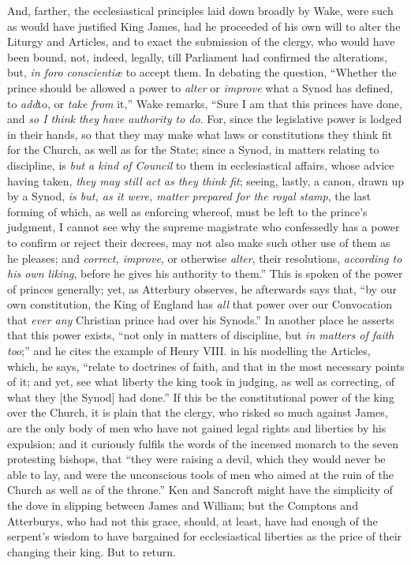 And, farther, the
ecclesiastical principles laid down broadly by Wake, were such as
would have justified King James, had he proceeded of his own will to
alter the Liturgy and Articles, and to exact the submission of the
clergy, who would have been bound, not, indeed, legally, till
Parliament had confirmed the alterations, but, \emph{in foro conscientiæ}
to accept them. In debating the question, ``Whether the prince should
be allowed a power to \emph{alter} or \emph{improve} what a Synod has
defined, to \emph{add}to, or \emph{take from} it,'' Wake remarks, ``Sure
I am that this princes have done, and \emph{so I think they have
authority to do}. For, since the legislative power is lodged in
their hands, so that they may make what laws or constitutions they
think fit for the Church, as well as for the State; since a Synod, in
matters relating to discipline, is \emph{but a kind of Council} to
them in ecclesiastical affairs, whose advice having taken, \emph{they
may still act as they think fit}; seeing, lastly, a canon, drawn up
by a Synod, \emph{is but, as it were, matter prepared for the royal stamp},
the last forming of which, as well as enforcing whereof, must be left
to the prince's judgment, I cannot see why the supreme magistrate who
confessedly has a power to confirm or reject their decrees, may not
also make such other use of them as he pleases; and \emph{correct,
improve}, or otherwise \emph{alter}, their resolutions, \emph{according
to his own liking}, before he gives his authority to them.'' This is
spoken of the power of princes generally; yet, as Atterbury observes,
he afterwards says that, ``by our own constitution, the King of England
has \emph{all} that power over our Convocation that \emph{ever any}
Christian prince had over his Synods.'' In another place he asserts
that this power exists, ``not only in matters of discipline, but \emph{in
matters of faith too};'' and he cites the example of Henry VIII. in
his modelling the Articles, which, he says, ``relate to doctrines of
faith, and that in the most necessary points of it; and yet, see what
liberty the king took in judging, as well as correcting, of what they
[the Synod] had done.'' If this be the constitutional power of the king
over the Church, it is plain that the clergy, who risked so much
against James, are the only body of men who have not gained legal
rights and liberties by his expulsion; and it curiously fulfils the
words of the incensed monarch to the seven protesting bishops, that ``they
were raising a devil, which they would never be able to lay, and were
the unconscious tools of men who aimed at the ruin of the Church as
well as of the throne.'' Ken and Sancroft might have the simplicity of
the dove in slipping between James and William; but the Comptons and
Atterburys, who had not this grace, should, at least, have had enough
of the serpent's wisdom to have bargained for ecclesiastical
liberties as the price of their changing their king. But to return.

